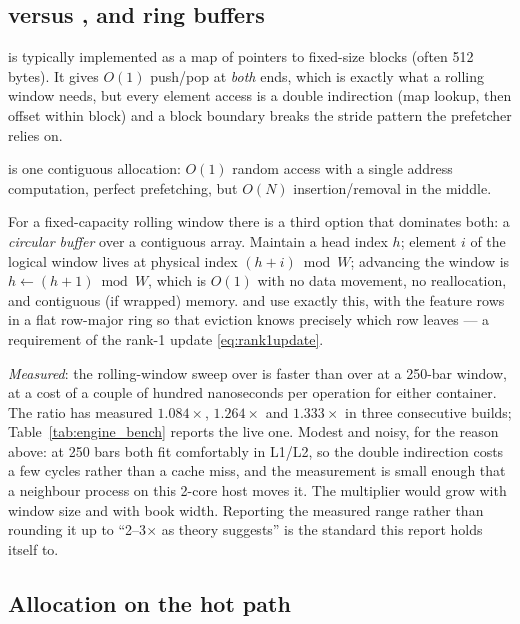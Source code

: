 \subsection{ versus , and ring buffers}
\label{sec:sys:vector}

 is typically implemented as a map of pointers to fixed-size blocks
(often 512 bytes). It gives $O(1)$ push/pop at \emph{both} ends, which is exactly what a
rolling window needs, but every element access is a double indirection (map lookup, then
offset within block) and a block boundary breaks the stride pattern the prefetcher
relies on.

 is one contiguous allocation: $O(1)$ random access with a single
address computation, perfect prefetching, but $O(N)$ insertion/removal in the middle.

For a fixed-capacity rolling window there is a third option that dominates both: a
\emph{circular buffer} over a contiguous array. Maintain a head index $h$; element $i$ of
the logical window lives at physical index $(h+i)\bmod W$; advancing the window is
$h\leftarrow(h+1)\bmod W$, which is $O(1)$ with no data movement, no reallocation, and
contiguous (if wrapped) memory.  and
 use exactly this, with the feature rows in a flat
row-major ring so that eviction knows precisely which row leaves --- a requirement of the
rank-1 update \eqref{eq:rank1update}.

\emph{Measured}: the rolling-window sweep over  is faster than over
 at a 250-bar window, at a cost of a couple of hundred nanoseconds per
operation for either container. The ratio has measured $1.084\times$, $1.264\times$ and
$1.333\times$ in three consecutive builds; Table~\ref{tab:engine_bench} reports the live
one. Modest and noisy, for the reason above: at 250 bars both fit comfortably in L1/L2, so
the double indirection costs a few cycles rather than a cache miss, and the measurement is
small enough that a neighbour process on this 2-core host moves it. The multiplier would
grow with window size and with book width. Reporting the measured range rather than
rounding it up to ``2--3$\times$ as theory suggests'' is the standard this report holds
itself to.

\subsection{Allocation on the hot path}
\label{sec:sys:alloc}

